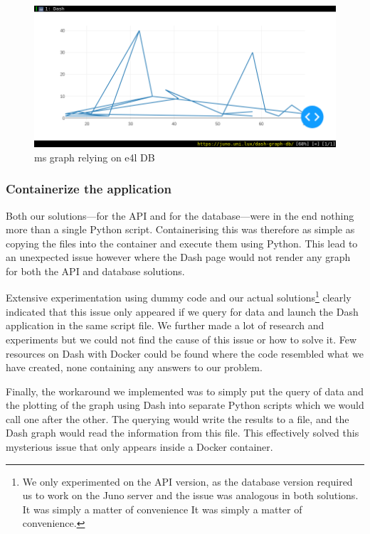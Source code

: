 \begin{figure}
	\centering
	\includegraphics[width=\linewidth]{images/dash-DB-demo.png}
	\caption{\gls{ms} graph relying on \gls{e4l} DB}
	\label{fig:dash-db}
\end{figure}

\subsubsection{Containerize the application}

Both our solutions---for the API and for the database---were in the
end nothing more than a single Python script. Containerising this was
therefore as simple as copying the files into the container and
execute them using Python. This lead to an unexpected issue however
where the Dash page would not render any graph for both the API and
database solutions.

Extensive experimentation using dummy code and our actual
solutions\footnote{We only experimented on the API version, as the
	database version required us to work on the Juno server and the
	issue was analogous in both solutions. It was simply a matter of
convenience It was simply a matter of convenience.} clearly indicated
that this issue only appeared if we query for data and launch the Dash
application in the same script file. We further made a lot of research
and experiments but we could not find the cause of this issue or how
to solve it. Few resources on Dash with Docker could be found where
the code resembled what we have created, none containing any answers
to our problem.

Finally, the workaround we implemented was to simply put the query of
data and the plotting of the graph using Dash into separate Python
scripts which we would call one after the other. The querying would
write the results to a file, and the Dash graph would read the
information from this file. This effectively solved this mysterious
issue that only appears inside a Docker container.

